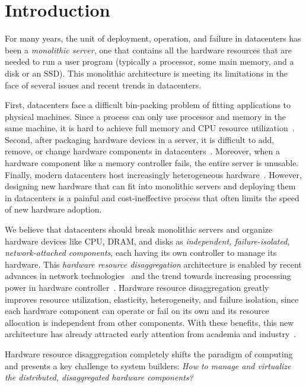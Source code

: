 \section{Introduction}
\label{sec:lego:introduction}

For many years, the unit of deployment, operation, and failure in datacenters has been a {\em monolithic server},
one that contains all the hardware resources 
that are needed to run a user program
(typically a processor, some main memory, and a disk or an SSD).
This monolithic architecture is meeting its limitations in the face of 
several issues and recent trends in datacenters.

First, datacenters face a difficult bin-packing problem of fitting applications to physical machines.
Since a process can only use processor and memory in the same machine, 
it is hard to achieve full memory and CPU resource utilization~\cite{Barroso-COMPUTER,Quasar-ASPLOS,PowerNap}.
Second, after packaging hardware devices in a server, it is difficult to add, remove, or change 
hardware components in datacenters~\cite{FB-Wedge100}. 
Moreover, when a hardware component like a memory controller fails, the entire server is unusable.
Finally, modern datacenters host increasingly heterogeneous hardware~\cite{sigarch-dc,Putnam14-FPGA,TPU,DPU}.
However, designing new hardware that can fit into monolithic servers and deploying them in datacenters
is a painful and cost-ineffective process that often limits the speed of new hardware adoption.

We believe that datacenters should break monolithic servers
and organize hardware devices like CPU, DRAM, and disks 
as {\em independent, failure-isolated, network-attached components},
each having its own controller to manage its hardware.
This {\em hardware resource disaggregation} architecture  
is enabled by recent advances in network technologies~\cite{IB-RTT,GenZ,Mellanox-ConnectX6-IB,OpenCAPI,Omni-Path,ccix} 
and the trend towards increasing processing power in hardware controller~\cite{Willow,Ahn15-PIM,Bojnordi12}.
Hardware resource disaggregation greatly improves resource utilization, elasticity, 
heterogeneity, and failure isolation,
since each hardware component can operate or fail on its own and its resource allocation is independent from other components.
With these benefits, this new architecture has already attracted early attention 
from academia and industry~\cite{OCP,HP-TheMachine,FireBox-FASTKeynote,Lim09-disaggregate,Nitu18-EUROSYS,dRedBox-DATE}.

Hardware resource disaggregation completely shifts the paradigm of computing
and presents a key challenge to system builders:
{\em How to manage and virtualize the distributed, disaggregated hardware components?}

